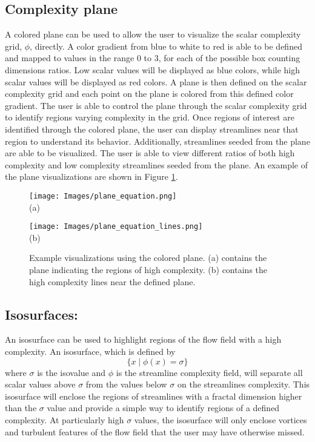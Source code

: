 \documentclass{egpubl}
\begin{document}
\subsection{Complexity plane}
A colored plane can be used to allow the user to visualize the scalar complexity grid, $\phi$, directly.
A color gradient from blue to white to red is able to be defined and mapped to values in the range 0 to 3, for each of the possible box counting dimensions ratios.
Low scalar values will be displayed as blue colors, while high scalar values will be displayed as red colors.
A plane is then defined on the scalar complexity grid and each point on the plane is colored from this defined color gradient.
The user is able to control the plane through the scalar complexity grid to identify regions varying complexity in the grid.
Once regions of interest are identified through the colored plane, the user can display streamlines near that region to understand its behavior.
Additionally, streamlines seeded from the plane are able to be visualized.
The user is able to view different ratios of both high complexity and low complexity streamlines seeded from the plane.
An example of the plane visualizations are shown in Figure \ref{fig:plane}.

\begin{figure}[h]
        \centering
                \begin{minipage}{0.45\linewidth}
                        \small \centering
                        \texttt{[image: Images/plane\_equation.png]}\\(a)
                \end{minipage}
                \begin{minipage}{0.45\linewidth}
                        \small \centering
                        \texttt{[image: Images/plane\_equation\_lines.png]}\\(b)
                \end{minipage}
        \caption{Example visualizations using the colored plane. (a) contains the plane indicating the regions of high complexity. (b) contains the high complexity lines near the defined plane.}
        \label{fig:plane}
\end{figure}

\subsection{Isosurfaces:} 
An isosurface can be used to highlight regions of the flow field with a high complexity.
An isosurface, which is defined by
\begin{equation} \{ x \mid \phi(x) = \sigma \}\end{equation}
where $\sigma$ is the isovalue and $\phi$ is the streamline complexity field, will separate all scalar values above $\sigma$ from the values below $\sigma$ on the streamlines complexity.
This isosurface will enclose the regions of streamlines with a fractal dimension higher than the $\sigma$ value and provide a simple way to identify regions of a defined complexity.
At particularly high $\sigma$ values, the isosurface will only enclose vortices and turbulent features of the flow field that the user may have otherwise missed.
\end{document}
